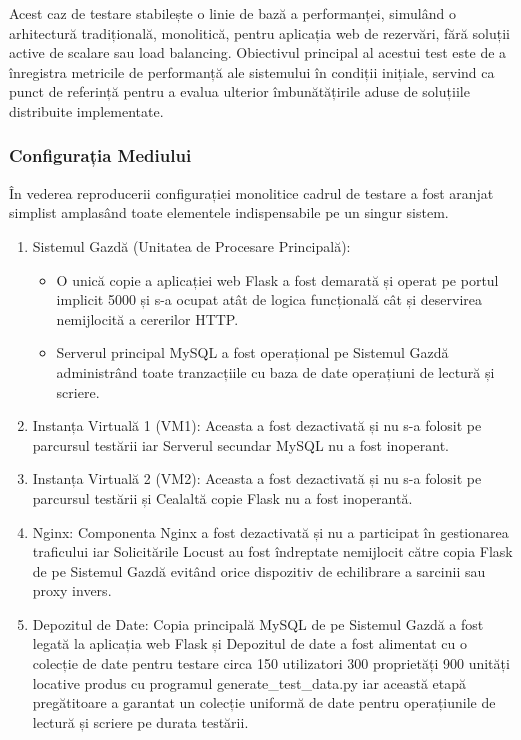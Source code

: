 \documentclass[12pt, a4paper, oneside, romanian]{teza-upb}
\begin{document}
Acest caz de testare stabilește o linie de bază a performanței, simulând o arhitectură tradițională, monolitică, pentru aplicația web de rezervări, fără soluții active de scalare sau load balancing. Obiectivul principal al acestui test este de a înregistra metricile de performanță ale sistemului în condiții inițiale, servind ca punct de referință pentru a evalua ulterior îmbunătățirile aduse de soluțiile distribuite implementate.

\subsubsection{Configurația Mediului}

În vederea reproducerii configurației monolitice cadrul de testare a fost aranjat simplist amplasând toate elementele indispensabile pe un singur sistem.

\begin{enumerate}
	\item Sistemul Gazdă (Unitatea de Procesare Principală):
	\begin{itemize}
		\item O unică copie a aplicației web Flask a fost demarată și operat pe portul implicit 5000 și s-a ocupat atât de logica funcțională cât și deservirea nemijlocită a cererilor HTTP.
		\item Serverul principal MySQL a fost operațional pe Sistemul Gazdă administrând toate tranzacțiile cu baza de date operațiuni de lectură și scriere.
	\end{itemize}
	\item Instanța Virtuală 1 (VM1): Aceasta a fost dezactivată și nu s-a folosit pe parcursul testării iar Serverul secundar MySQL nu a fost inoperant.
	\item Instanța Virtuală 2 (VM2): Aceasta a fost dezactivată și nu s-a folosit pe parcursul testării și Cealaltă copie Flask nu a fost inoperantă.
	\item Nginx: Componenta Nginx a fost dezactivată și nu a participat în gestionarea traficului iar Solicitările Locust au fost îndreptate nemijlocit către copia Flask de pe Sistemul Gazdă evitând orice dispozitiv de echilibrare a sarcinii sau proxy invers.
	\item Depozitul de Date: Copia principală MySQL de pe Sistemul Gazdă a fost legată la aplicația web Flask și Depozitul de date a fost alimentat cu o colecție de date pentru testare circa 150 utilizatori 300 proprietăți 900 unități locative produs cu programul generate\_test\_data.py iar această etapă pregătitoare a garantat un colecție uniformă de date pentru operațiunile de lectură și scriere pe durata testării.
\end{enumerate}
\end{document}
